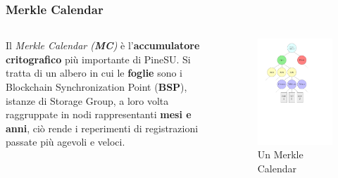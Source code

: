 \documentclass{beamer}
\begin{document}
\begin{frame}
	\frametitle{Merkle Calendar}
	\begin{columns}
		Il \emph{Merkle Calendar (\textbf{MC})} è l'\textbf{accumulatore critografico}
		più importante di PineSU. Si tratta di un albero in cui le \textbf{foglie} sono
		i Blockchain Synchronization Point (\textbf{BSP}), istanze di
		Storage Group, a loro volta raggruppate in nodi rappresentanti
		\textbf{mesi e anni}, ciò rende i reperimenti di registrazioni passate
		più agevoli e veloci.
		\centering
		\begin{figure}
			\includegraphics[width=\textwidth]{figures/mc1.pdf}
			\caption{Un Merkle Calendar}
		\end{figure} 
	\end{columns}
\end{frame}
\end{document}
